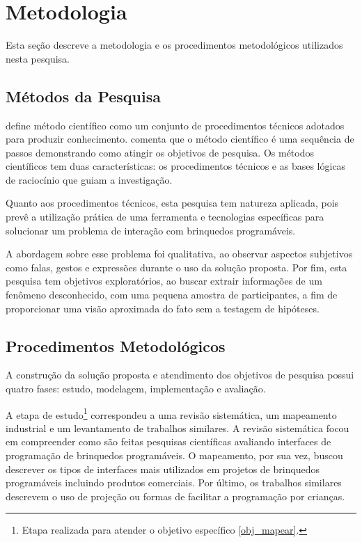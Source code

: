 \section{Metodologia}
\label{s_cintro_metodologia}

Esta seção descreve a metodologia e os procedimentos metodológicos utilizados nesta pesquisa.

\subsection{Métodos da Pesquisa}
\label{ss_cintro_metod_pesquisa}

 define método científico como um conjunto de procedimentos técnicos adotados para produzir conhecimento.  comenta que o método científico é uma sequência de passos demonstrando como atingir os objetivos de pesquisa. Os métodos científicos tem duas características: os procedimentos técnicos e as bases lógicas de raciocínio que guiam a investigação.

Quanto aos procedimentos técnicos, esta pesquisa tem natureza aplicada, pois prevê a utilização prática de uma ferramenta e tecnologias específicas para solucionar um problema de interação com brinquedos programáveis.

A abordagem sobre esse problema foi qualitativa, ao observar aspectos subjetivos como falas, gestos e expressões durante o uso da solução proposta. Por fim, esta pesquisa tem objetivos exploratórios, ao buscar extrair informações de um fenômeno desconhecido, com uma pequena amostra de participantes, a fim de proporcionar uma visão aproximada do fato sem a testagem de hipóteses.

\subsection{Procedimentos Metodológicos}
\label{ss_cintro_proced_metodologicos}

A construção da solução proposta e atendimento dos objetivos de pesquisa possui quatro fases: estudo, modelagem, implementação e avaliação.

A etapa de estudo\footnote{Etapa realizada para atender o objetivo específico \autoref{obj_mapear}. } correspondeu a uma revisão sistemática, um mapeamento industrial e um levantamento de trabalhos similares. A revisão sistemática focou em compreender como são feitas pesquisas científicas avaliando interfaces de programação de brinquedos programáveis. O mapeamento, por sua vez, buscou descrever os tipos de interfaces mais utilizados em projetos de brinquedos programáveis incluindo produtos comerciais. Por último, os trabalhos similares descrevem o uso de projeção ou formas de facilitar a programação por crianças.

